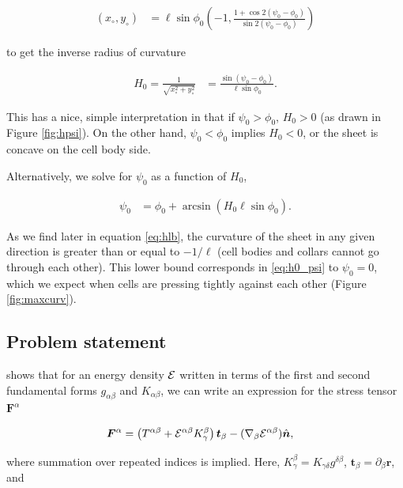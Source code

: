 \begin{align*}
    (x_\circ, y_\circ) &= \ell \sin\phi_0\left(-1, \frac{1+\cos2(\psi_0 - \phi_0)}{\sin2(\psi_0 - \phi_0)} \right)
\end{align*}

\noindent to get the inverse radius of curvature 

\begin{align}
    H_0 = \frac{1}{\sqrt{x_\circ^2 + y_\circ^2}} &= \frac{\sin(\psi_0 - \phi_0)}{\ell \sin\phi_0}. \label{eq:h0}
\end{align}

This has a nice, simple interpretation in that if $\psi_0 > \phi_0$, $H_0 > 0$ (as drawn in Figure \ref{fig:hpsi}). On the other hand, $\psi_0 < \phi_0$ implies $H_0 < 0$, or the sheet is concave on the cell body side. 

Alternatively, we solve for $\psi_0$ as a function of $H_0$,

\begin{align}
    \psi_0 &= \phi_0 + \arcsin \left( H_0 \ell \sin \phi_0 \right). \label{eq:h0_psi}
\end{align}

As we find later in equation \ref{eq:hlb}, the curvature of the sheet in any given direction is greater than or equal to $-1/\ell$ (cell bodies and collars cannot go through each other). This lower bound corresponds in \ref{eq:h0_psi} to $\psi_0 = 0$, which we expect when cells are pressing tightly against each other (Figure \ref{fig:maxcurv}).

\subsection{Problem statement} \label{subsec:problem}

\citet{powers2010} shows that for an energy density $\mathcal{E}$ written in terms of the first and second fundamental forms $g_{\alpha\beta}$ and $K_{\alpha\beta}$, we can write an expression for the stress tensor $\bm{F}^\alpha$ 

\begin{align}
    \bm{F}^\alpha &= \left(T^{\alpha\beta} + \mathcal{E}^{\alpha\beta}K_\gamma^\beta \right)\bm{t}_\beta - (\nabla_\beta \mathcal{E}^{\alpha\beta})\hat{\bm{n}}, \label{eq:stress}
\end{align}

\noindent where summation over repeated indices is implied. Here, $K_\gamma^\beta = K_{\gamma \delta}g^{\delta \beta}$, $\bm{t}_\beta = \partial_\beta \bm{r}$, and 

